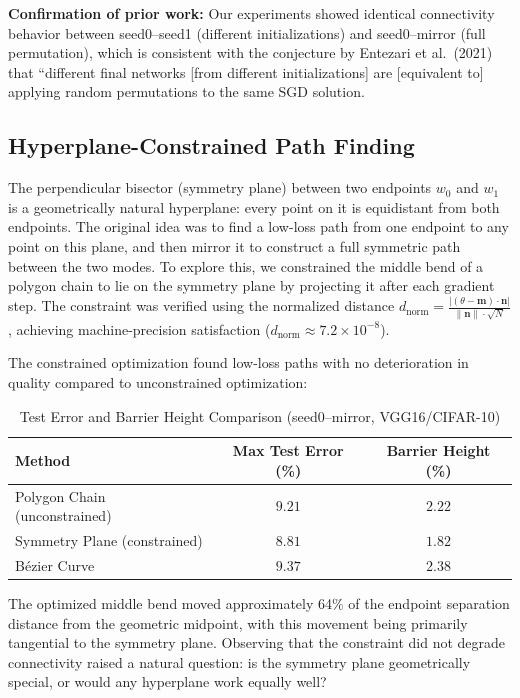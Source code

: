 \documentclass[11pt,a4paper]{article}
\begin{document}
\textbf{Confirmation of prior work:} Our experiments showed identical 
connectivity behavior between seed0--seed1 (different initializations) 
and seed0--mirror (full permutation), which is consistent with the 
conjecture by Entezari et al.\ (2021) that ``different final networks 
[from different initializations] are [equivalent to] applying random 
permutations to the same SGD solution.
\subsection{Hyperplane-Constrained Path Finding}

The perpendicular bisector (symmetry plane) between two endpoints $w_0$ and $w_1$ is a geometrically natural hyperplane: every point on it is equidistant from both endpoints. The original idea was to find a low-loss path from one endpoint to any point on this plane, and then mirror it to construct a full symmetric path between the two modes. To explore this, we constrained the middle bend of a polygon chain to lie on the symmetry plane by projecting it after each gradient step. The constraint was verified using the normalized distance $d_{\text{norm}} = \frac{|(\theta - \mathbf{m}) \cdot \mathbf{n}|}{\|\mathbf{n}\| \cdot \sqrt{N}}$, achieving machine-precision satisfaction ($d_{\text{norm}} \approx 7.2 \times 10^{-8}$).

The constrained optimization found low-loss paths with no deterioration in quality compared to unconstrained optimization:

\begin{table}[H]
    \centering
    \caption{Test Error and Barrier Height Comparison (seed0--mirror, VGG16/CIFAR-10)}
    \label{tab:performance}
    \begin{tabular}{l c c}
        \toprule
        \textbf{Method} & \textbf{Max Test Error (\%)} & \textbf{Barrier Height (\%)} \\
        \midrule
        Polygon Chain (unconstrained) & $9.21$ & $2.22$ \\
        Symmetry Plane (constrained) & $8.81$ & $1.82$ \\
        B\'{e}zier Curve & $9.37$ & $2.38$ \\
        \bottomrule
    \end{tabular}
\end{table}

The optimized middle bend moved approximately 64\% of the endpoint separation distance from the geometric midpoint, with this movement being primarily tangential to the symmetry plane. Observing that the constraint did not degrade connectivity raised a natural question: is the symmetry plane geometrically special, or would any hyperplane work equally well?
\end{document}
